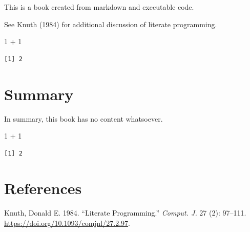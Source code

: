 \documentclass[
  letterpaper,
  DIV=11,
  numbers=noendperiod]{scrreprt}
\newenvironment{Shaded}{\begin{snugshade}}{\end{snugshade}}
\newcommand{\DecValTok}[1]{\textcolor[rgb]{0.68,0.00,0.00}{#1}}
\newcommand{\SpecialCharTok}[1]{\textcolor[rgb]{0.37,0.37,0.37}{#1}}
\newlength{\cslhangindent}
\newlength{\cslentryspacingunit} %
\newenvironment{CSLReferences}[2] %
 {%
  \setlength{\parindent}{0pt}
  \ifodd #1
  \let\oldpar\par
  \def\par{\hangindent=\cslhangindent\oldpar}
  \fi
  \setlength{\parskip}{#2\cslentryspacingunit}
 }%
 {}
\begin{document}
This is a book created from markdown and executable code.

See Knuth (1984) for additional discussion of literate programming.

\begin{Shaded}
\begin{Highlighting}[]
\DecValTok{1} \SpecialCharTok{+} \DecValTok{1}
\end{Highlighting}
\end{Shaded}

\begin{verbatim}
[1] 2
\end{verbatim}


\hypertarget{summary}{%
\chapter{Summary}\label{summary}}

In summary, this book has no content whatsoever.

\begin{Shaded}
\begin{Highlighting}[]
\DecValTok{1} \SpecialCharTok{+} \DecValTok{1}
\end{Highlighting}
\end{Shaded}

\begin{verbatim}
[1] 2
\end{verbatim}


\hypertarget{references}{%
\chapter*{References}\label{references}}


\hypertarget{refs}{}
\begin{CSLReferences}{1}{0}
\leavevmode{}%
Knuth, Donald E. 1984. {``Literate Programming.''} \emph{Comput. J.} 27
(2): 97--111. \url{https://doi.org/10.1093/comjnl/27.2.97}.

\end{CSLReferences}
\end{document}
